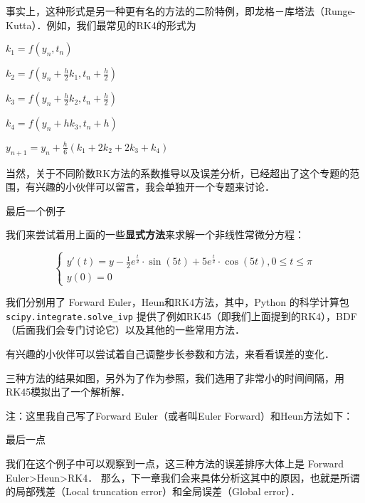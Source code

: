 事实上，这种形式是另一种更有名的方法的二阶特例，即龙格－库塔法（Runge-Kutta）．例如，我们最常见的RK4的形式为

 $k_1=f(y_n,t_n)$  

 $k_2=f\left(y_n+\frac{h}{2}k_1, t_n+\frac{h}{2}\right)$  

 $k_3=f\left(y_n+\frac{h}{2}k_2, t_n+\frac{h}{2}\right)$  

 $k_4=f\left(y_n+hk_3, t_n+h\right)$  

 $y_{n+1}=y_{n}+\frac{h}{6}(k_1+2k_2+2k_3+k_4)$  

当然，关于不同阶数RK方法的系数推导以及误差分析，已经超出了这个专题的范围，有兴趣的小伙伴可以留言，我会单独开一个专题来讨论．



最后一个例子

我们来尝试着用上面的一些\textbf{显式方法}来求解一个非线性常微分方程：

\begin{equation}
\begin{cases}
 y'(t) = y-\frac{1}{2}e^{\frac{t}{2}}\cdot\sin(5t)+5e^{\frac{t}{2}}\cdot\cos(5t), 0\le t\le \pi\\     y(0)=0
\end{cases}
\end{equation}

我们分别用了 Forward Euler，Heun和RK4方法，其中，Python 的科学计算包 \verb|scipy.integrate.solve_ivp|   提供了例如RK45（即我们上面提到的RK4），BDF（后面我们会专门讨论它）以及其他的一些常用方法．

有兴趣的小伙伴可以尝试着自己调整步长参数和方法，来看看误差的变化．


三种方法的结果如图，另外为了作为参照，我们选用了非常小的时间间隔，用RK45模拟出了一个解析解．

注：这里我自己写了Forward Euler（或者叫Euler Forward）和Heun方法如下：


    
最后一点

我们在这个例子中可以观察到一点，这三种方法的误差排序大体上是 Forward Euler>Heun>RK4． 那么，下一章我们会来具体分析这其中的原因，也就是所谓的局部残差（Local truncation error）和全局误差（Global error）．

